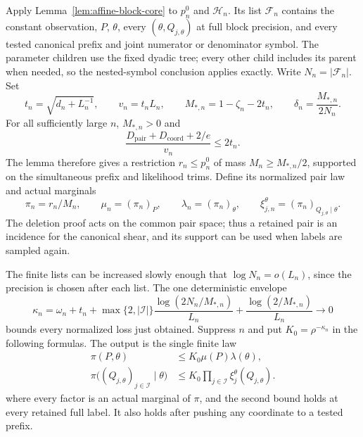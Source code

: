 Apply Lemma~\ref{lem:affine-block-core} to $p_n^0$ and $\mathcal H_n$.
Its list $\mathcal F_n$ contains the constant observation, $P$,
$\theta$, every $(\theta,Q_{j,\theta})$ at full block precision,
and every tested canonical prefix and joint numerator or denominator
symbol.  The parameter children use the fixed dyadic tree; every other
child includes its parent when needed, so the nested-symbol conclusion
applies exactly.  Write $N_n=|\mathcal F_n|$.
Set
\[
 t_n=\sqrt{d_n+L_n^{-1}},\qquad v_n=t_nL_n,\qquad
 M_{*,n}=1-\zeta_n-2t_n,\qquad
 \delta_n=\frac{M_{*,n}}{2N_n}.
\]
For all sufficiently large $n$, $M_{*,n}>0$ and
\[
 \frac{D_{\mathrm{pair}}+D_{\mathrm{coord}}+2/e}{v_n}
 \le 2t_n.
\]
The lemma therefore gives a restriction $r_n\le p_n^0$ of mass
$M_n\ge M_{*,n}/2$, supported on the simultaneous prefix and
likelihood trims.  Define its normalized pair law and actual marginals
\[
 \pi_n=r_n/M_n,\qquad \mu_n=(\pi_n)_P,\qquad
 \lambda_n=(\pi_n)_\theta,\qquad
 \xi_{j,n}^{\theta}=(\pi_n)_{Q_{j,\theta}\mid\theta}.
\]
The deletion proof acts on the common pair space; thus a retained
pair is an incidence for the canonical shear, and its support can
be used when labels are sampled again.

The finite lists can be increased slowly enough that
$\log N_n=o(L_n)$, since the precision is chosen after each list.
The one deterministic envelope
\[
 \kappa_n=
 \omega_n+t_n+
 \max\{2,|\mathcal I|\}\frac{\log(2N_n/M_{*,n})}{L_n}
 +\frac{\log(2/M_{*,n})}{L_n}
 \longrightarrow0
\]
bounds every normalized loss just obtained.  Suppress $n$ and put
$K_0=\rho^{-\kappa_n}$ in the following formulas.  The output is
the single finite law
\begin{equation}
 \begin{aligned}
 \pi(P,\theta)&\le K_0\mu(P)\lambda(\theta),\\
 \pi\bigl((Q_{j,\theta})_{j\in\mathcal I}\mid\theta\bigr)
       &\le K_0\prod_{j\in\mathcal I}\xi_j^\theta(Q_{j,\theta}).
 \end{aligned}
 \label{eq:rate-one-label-product}
\end{equation}
where every factor is an actual marginal of $\pi$, and the second
bound holds at every retained full label.  It also holds after
pushing any coordinate to a tested prefix.

